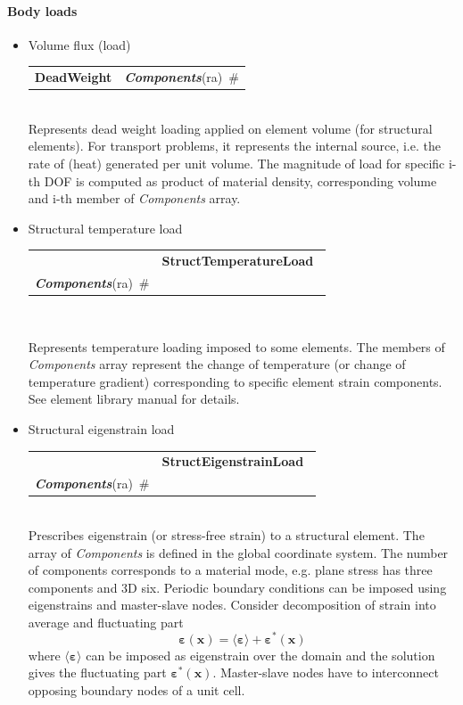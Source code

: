 \documentclass[a4paper]{article}
\makeatletter
\newcommand{\vect}[1]{\mathbf{#1}} %
\newcommand{\tens}[1]{\pmb{#1}} %
\newcommand{\strain}{\varepsilon}
\newcommand{\param}[1]{{\em #1}}
\newcommand{\keywordnotype}[1]{\mbox{{\it{\bf{#1}}}}}
\newcommand{\keyword}[2]{\mbox{{\keywordnotype{#1}\tiny (#2)}}}
\newcommand{\entKeywordInst}[1]{\mbox{{\bf{{#1}}}}}
\newcommand{\field}[2]{\mbox{\keyword{#1}{#2}~\#}}
\newenvironment{record}[1][]{\begin{tabular}{|ll}}{\end{tabular}\\}
\newcommand{\recentry}[2]{{#1}&{#2}\\}
\newcounter{rcc}
\newenvironment{record}[1][\textwidth]{\setcounter{rcc}{0}\begin{tabular*}{#1}{|ll@{\extracolsep{\fill}}r}}{\end{tabular*}\\}
\newcommand{\recentry}[2]{\ifthenelse{\value{rcc}>0}{&$\backslash$ \\}{\setcounter{rcc}{1}}{#1}&{#2}}
\makeatother
\begin{document}
\paragraph{Body loads}
\begin{itemize}
\item Volume flux (load)

\noindent
\begin{record}[0.9\textwidth]
  \recentry{\entKeywordInst{DeadWeight}}{\field{Components}{ra}}
\end{record}
Represents dead weight loading applied on element volume (for
structural elements). For transport problems, it represents the
internal source, i.e. the rate of (heat) generated per unit volume.
The magnitude of load for specific i-th DOF is computed as product of material density,
corresponding volume and i-th member of \param{Components} array.
\item Structural temperature load

\noindent
\begin{record}[0.9\textwidth]
  \recentry{}{\entKeywordInst{StructTemperatureLoad}~}{\field{Components}{ra}}
\end{record}

Represents temperature loading imposed to some elements. The members of
\param{Components} array represent the change of temperature (or change
of temperature gradient) corresponding to
specific element strain components. See element library manual for details.

\item Structural eigenstrain load

\noindent
\begin{record}[0.9\textwidth]
  \recentry{}{\entKeywordInst{StructEigenstrainLoad}~}{\field{Components}{ra}}
\end{record}
Prescribes eigenstrain (or stress-free strain) to a structural element. The array of \param{Components} is defined in the global coordinate system. The number of components corresponds to a material mode, e.g. plane stress has three components and 3D six. Periodic boundary conditions can be imposed using eigenstrains and master-slave nodes. Consider decomposition of strain into average and fluctuating part
\begin{equation}
\tens{\strain}(\vect{x}) = \langle \tens{\strain} \rangle + \tens{\strain}^*(\vect{x})
\end{equation}
where $\langle \tens{\strain} \rangle$ can be imposed as eigenstrain over the domain and the solution gives the fluctuating part $\tens{\strain}^*(\vect{x})$. Master-slave nodes have to interconnect opposing boundary nodes of a unit cell.


\end{itemize}
\end{document}
